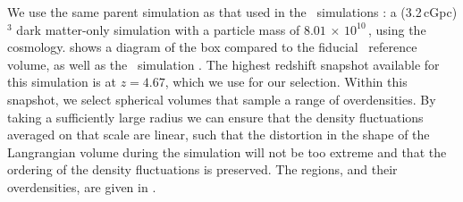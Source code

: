 We use the same parent simulation as that used in the \ceagle\ simulations \citep{barnes_redshift_2017}: a (3.2\,cGpc)$^3$ dark matter-only simulation with a particle mass of $8.01 \,\times\, 10^{10}$\,\Msun, using the \cite{planck_collaboration_planck_2014} cosmology.
 shows a diagram of the box compared to the fiducial \eagle\ reference volume, as well as the \bluetides\ simulation \citep{feng_bluetides_2016}.
The highest redshift snapshot available for this simulation is at $z = 4.67$, which we use for our selection.
Within this snapshot, we select spherical volumes that sample a range of overdensities.
By taking a sufficiently large radius we can ensure that the density fluctuations averaged on that scale are linear, such that the distortion in the shape of the Langrangian volume during the simulation will not be too extreme and that the ordering of the density fluctuations is preserved.
The regions, and their overdensities, are given in .

